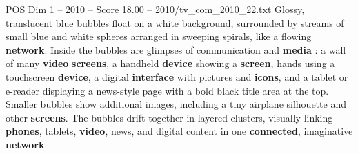 \begin{textsample}{POS Dim 1 – 2010 – Score 18.00 – 2010/tv\_com\_2010\_22.txt}
Glossy, translucent blue bubbles float on a white background, surrounded by streams of small blue and white spheres arranged in sweeping spirals, like a flowing \textbf{network}.
Inside the bubbles are glimpses of communication and \textbf{media} : a wall of many \textbf{video} \textbf{screens}, a handheld \textbf{device} showing a \textbf{screen}, hands using a touchscreen \textbf{device}, a digital \textbf{interface} with pictures and \textbf{icons}, and a tablet or e-reader displaying a news-style page with a bold black title area at the top.
Smaller bubbles show additional images, including a tiny airplane silhouette and other \textbf{screens}.
The bubbles drift together in layered clusters, visually linking \textbf{phones}, tablets, \textbf{video}, news, and digital content in one \textbf{connected}, imaginative \textbf{network}.

\end{textsample}
